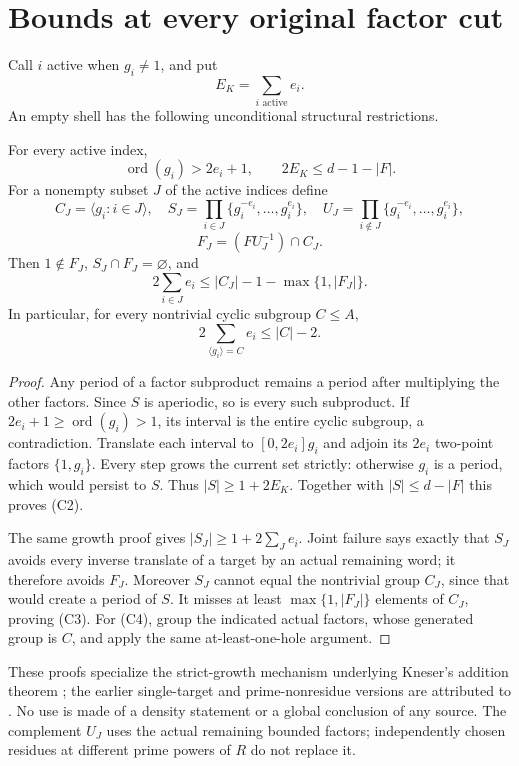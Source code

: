 \section{Bounds at every original factor cut}
Call $i$ active when $g_i\ne1$, and put
\[
 E_K=\sum_{i\text{ active}}e_i.                            \tag{C1}
\]
An empty shell has the following unconditional structural restrictions.

\begin{theorem}\label{thm:cuts}
For every active index,
\[
 \operatorname{ord}(g_i)>2e_i+1,
 \qquad
 \boxed{2E_K\le d-1-|F|.}                               \tag{C2}
\]
For a nonempty subset $J$ of the active indices define
\[
 C_J=\langle g_i:i\in J\rangle,\quad
 S_J=\prod_{i\in J}\{g_i^{-e_i},\ldots,g_i^{e_i}\},\quad
 U_J=\prod_{i\notin J}\{g_i^{-e_i},\ldots,g_i^{e_i}\},
\]
\[
 F_J=(F U_J^{-1})\cap C_J.
\]
Then $1\notin F_J$, $S_J\cap F_J=\varnothing$, and
\[
 \boxed{2\sum_{i\in J}e_i
 \le |C_J|-1-\max\{1,|F_J|\}.}                          \tag{C3}
\]
In particular, for every nontrivial cyclic subgroup $C\le A$,
\[
 \boxed{2\sum_{\langle g_i\rangle=C}e_i\le |C|-2.}       \tag{C4}
\]
\end{theorem}
\begin{proof}
Any period of a factor subproduct remains a period after multiplying the
other factors. Since $S$ is aperiodic, so is every such subproduct.
If $2e_i+1\ge\operatorname{ord}(g_i)>1$, its interval is the entire cyclic
subgroup, a contradiction. Translate each interval to $[0,2e_i]g_i$ and
adjoin its $2e_i$ two-point factors $\{1,g_i\}$. Every step grows the
current set strictly: otherwise $g_i$ is a period, which would persist to
$S$. Thus $|S|\ge1+2E_K$. Together with $|S|\le d-|F|$ this proves (C2).

The same growth proof gives $|S_J|\ge1+2\sum_J e_i$. Joint failure says
exactly that $S_J$ avoids every inverse translate of a target by an actual
remaining word; it therefore avoids $F_J$. Moreover $S_J$ cannot equal the
nontrivial group $C_J$, since that would create a period of $S$.
It misses at least $\max\{1,|F_J|\}$ elements of $C_J$, proving (C3).
For (C4), group the indicated actual factors, whose generated group is $C$,
and apply the same at-least-one-hole argument.
\end{proof}
These proofs specialize the strict-growth mechanism underlying Kneser's
addition theorem \cite[Theorem 1]{DeVos}; the earlier single-target and
prime-nonresidue versions are attributed to \cite{BryanDefect,BryanTwo}.
No use is made of a density statement or a global conclusion of any source.
The complement $U_J$ uses the actual remaining bounded factors; independently
chosen residues at different prime powers of $R$ do not replace it.

